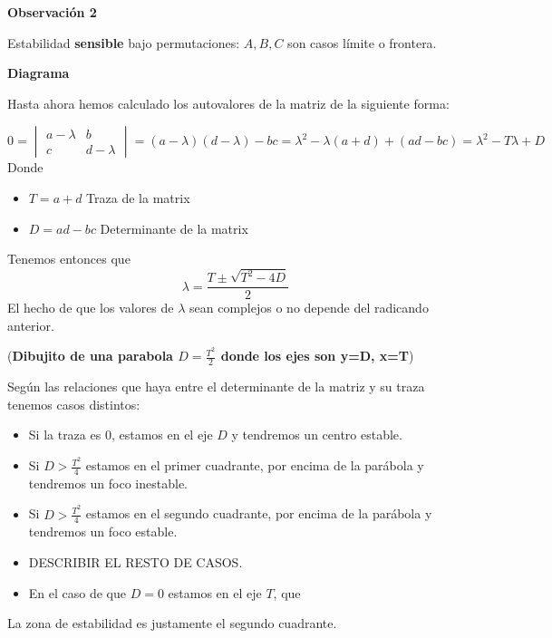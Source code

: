 \textbf{Observación 2}

Estabilidad \textbf{sensible} bajo permutaciones: $A, B, C$ son casos límite o frontera.

\textbf{Diagrama}

Hasta ahora hemos calculado los autovalores de la matriz de la siguiente forma:

$$0 = \begin{vmatrix}
a-\lambda& b\\c& d-\lambda
\end{vmatrix} = (a-\lambda)(d-\lambda)-bc = \lambda^2-\lambda(a+d)+(ad-bc) = \lambda^2-T\lambda+D$$
Donde
\begin{itemize}
\item $T = a+d$ Traza de la matrix
\item $D = ad-bc$ Determinante de la matrix
\end{itemize}
Tenemos entonces que
$$\lambda = \frac{T\pm\sqrt{T^2-4D}}{2}$$
El hecho de que los valores de $\lambda$ sean complejos o no depende del radicando anterior.

(\textbf{Dibujito de una parabola $D=\frac{T^2}{2}$ donde los ejes son y=D, x=T})

Según las relaciones que haya entre el determinante de la matriz y su traza tenemos casos distintos:
\begin{itemize}
\item Si la traza es 0, estamos en el eje $D$ y tendremos un centro estable.
\item Si $D>\frac{T^2}{4}$ estamos en el primer cuadrante, por encima de la parábola y tendremos un foco inestable.
\item Si $D>\frac{T^2}{4}$ estamos en el segundo cuadrante, por encima de la parábola y tendremos un foco estable.
\item DESCRIBIR EL RESTO DE CASOS.
\item En el caso de que $D=0$ estamos en el eje $T$, que 
\end{itemize}

La zona de estabilidad es justamente el segundo cuadrante.



